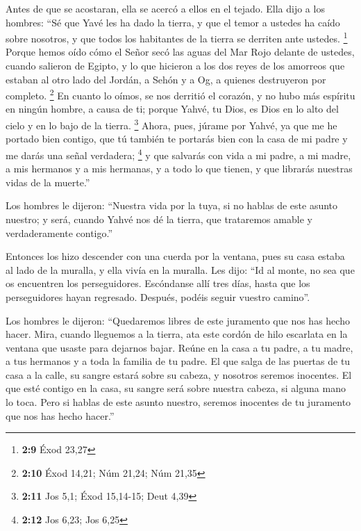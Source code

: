  Antes de que se acostaran, ella se acercó a ellos en el
tejado.  Ella dijo a los hombres: ``Sé que Yavé les ha
dado la tierra, y que el temor a ustedes ha caído sobre nosotros, y que
todos los habitantes de la tierra se derriten ante ustedes. \footnote{\textbf{2:9}
  Éxod 23,27}  Porque hemos oído cómo el Señor secó las
aguas del Mar Rojo delante de ustedes, cuando salieron de Egipto, y lo
que hicieron a los dos reyes de los amorreos que estaban al otro lado
del Jordán, a Sehón y a Og, a quienes destruyeron por completo.
\footnote{\textbf{2:10} Éxod 14,21; Núm 21,24; Núm 21,35}
 En cuanto lo oímos, se nos derritió el corazón, y no
hubo más espíritu en ningún hombre, a causa de ti; porque Yahvé, tu
Dios, es Dios en lo alto del cielo y en lo bajo de la tierra.
\footnote{\textbf{2:11} Jos 5,1; Éxod 15,14-15; Deut 4,39}
 Ahora, pues, júrame por Yahvé, ya que me he portado bien
contigo, que tú también te portarás bien con la casa de mi padre y me
darás una señal verdadera; \footnote{\textbf{2:12} Jos 6,23; Jos 6,25}
 y que salvarás con vida a mi padre, a mi madre, a mis
hermanos y a mis hermanas, y a todo lo que tienen, y que librarás
nuestras vidas de la muerte.''

 Los hombres le dijeron: ``Nuestra vida por la tuya, si
no hablas de este asunto nuestro; y será, cuando Yahvé nos dé la tierra,
que trataremos amable y verdaderamente contigo.''

 Entonces los hizo descender con una cuerda por la
ventana, pues su casa estaba al lado de la muralla, y ella vivía en la
muralla.  Les dijo: ``Id al monte, no sea que os
encuentren los perseguidores. Escóndanse allí tres días, hasta que los
perseguidores hayan regresado. Después, podéis seguir vuestro camino''.

 Los hombres le dijeron: ``Quedaremos libres de este
juramento que nos has hecho hacer.  Mira, cuando
lleguemos a la tierra, ata este cordón de hilo escarlata en la ventana
que usaste para dejarnos bajar. Reúne en la casa a tu padre, a tu madre,
a tus hermanos y a toda la familia de tu padre.  El que
salga de las puertas de tu casa a la calle, su sangre estará sobre su
cabeza, y nosotros seremos inocentes. El que esté contigo en la casa, su
sangre será sobre nuestra cabeza, si alguna mano lo toca.
 Pero si hablas de este asunto nuestro, seremos inocentes
de tu juramento que nos has hecho hacer.''

